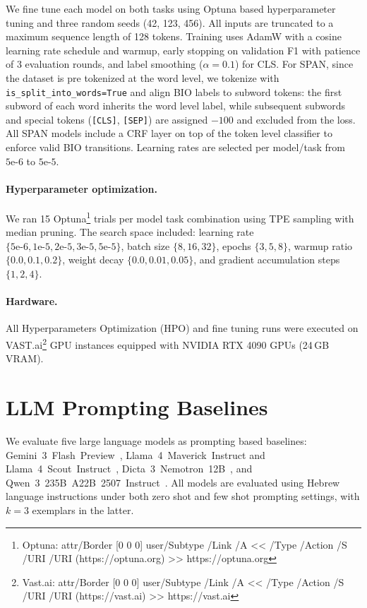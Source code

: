 \documentclass[11pt, a4paper]{report}
\newcommand{\href}[2]{%
  \pdfstartlink attr{/Border [0 0 0]}%
    user{/Subtype /Link /A << /Type /Action /S /URI /URI (#1) >>}%
  #2%
  \pdfendlink
}
\begin{document}
We fine tune each model on both tasks using Optuna based hyperparameter tuning and three random seeds (42, 123, 456). All inputs are truncated to a maximum sequence length of 128 tokens. Training uses AdamW with a cosine learning rate schedule and warmup, early stopping on validation F1 with patience of 3 evaluation rounds, and label smoothing ($\alpha{=}0.1$) for CLS. For SPAN, since the dataset is pre tokenized at the word level, we tokenize with \texttt{is\_split\_into\_words=True} and align BIO labels to subword tokens: the first subword of each word inherits the word level label, while subsequent subwords and special tokens (\texttt{[CLS]}, \texttt{[SEP]}) are assigned $-100$ and excluded from the loss. All SPAN models include a CRF layer \citep{lample2016neural} on top of the token level classifier to enforce valid BIO transitions. Learning rates are selected per model/task from $5\text{e-}6$ to $5\text{e-}5$.

\paragraph{Hyperparameter optimization.}
We ran 15 Optuna\footnote{Optuna: \href{https://optuna.org}{https://optuna.org}} trials per model task combination using TPE sampling with median pruning. The search space included: learning rate $\{5\text{e-}6, 1\text{e-}5, 2\text{e-}5, 3\text{e-}5, 5\text{e-}5\}$, batch size $\{8, 16, 32\}$, epochs $\{3, 5, 8\}$, warmup ratio $\{0.0, 0.1, 0.2\}$, weight decay $\{0.0, 0.01, 0.05\}$, and gradient accumulation steps $\{1, 2, 4\}$.

\paragraph{Hardware.}
All Hyperparameters Optimization (HPO) and fine tuning runs were executed on VAST.ai\footnote{Vast.ai: \href{https://vast.ai}{https://vast.ai}} GPU instances equipped with NVIDIA RTX 4090 GPUs (24\,GB VRAM).

\section{LLM Prompting Baselines}
\label{sec:llm_prompting}
We evaluate five large language models as prompting based baselines:
Gemini~3~Flash~Preview~\cite{google_gemini3_2024},
Llama~4~Maverick~Instruct and Llama~4~Scout~Instruct~\cite{MetaLlama4_2025},
Dicta~3~Nemotron~12B~\cite{Shmidman2025DictaLM3},
and Qwen~3~235B~A22B~2507~Instruct~\cite{qwen3_2025}.
All models are evaluated using Hebrew language instructions under both zero shot and few shot prompting settings, with $k=3$ exemplars in the latter.
\end{document}

